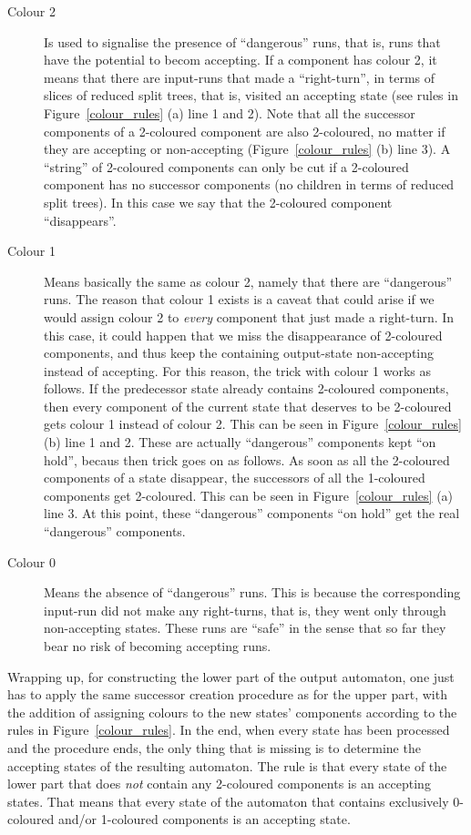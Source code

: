 \begin{description}
\item[Colour 2]
Is used to signalise the presence of ``dangerous'' runs, that is, runs that have the potential to becom accepting. If a component has colour 2, it means that there are input-runs that made a ``right-turn'', in terms of slices of reduced split trees, that is, visited an accepting state (see rules in Figure~\ref{colour_rules} (a) line 1 and 2). Note that all the successor components of a 2-coloured component are also 2-coloured, no matter if they are accepting or non-accepting (Figure~\ref{colour_rules} (b) line 3). A ``string'' of 2-coloured components can only be cut if a 2-coloured component has no successor components (no children in terms of reduced split trees). In this case we say that the 2-coloured component ``disappears''.

\item[Colour 1]
Means basically the same as colour 2, namely that there are ``dangerous'' runs. The reason that colour 1 exists is a caveat that could arise if we would assign colour 2 to \textit{every} component that just made a right-turn. In this case, it could happen that we miss the disappearance of 2-coloured components, and thus keep the containing output-state non-accepting instead of accepting. For this reason, the trick with colour 1 works as follows. If the predecessor state already contains 2-coloured components, then every component of the current state that deserves to be 2-coloured gets colour 1 instead of colour 2. This can be seen in Figure~\ref{colour_rules} (b) line 1 and 2. These are actually ``dangerous'' components kept ``on hold'', becaus then trick goes on as follows. As soon as all the 2-coloured components of a state disappear, the successors of all the 1-coloured components get 2-coloured. This can be seen in Figure~\ref{colour_rules} (a) line 3. At this point, these ``dangerous'' components ``on hold'' get the real ``dangerous'' components.

\item[Colour 0]
Means the absence of ``dangerous'' runs. This is because the corresponding input-run did not make any right-turns, that is, they went only through non-accepting states. These runs are ``safe'' in the sense that so far they bear no risk of becoming accepting runs.
\end{description}

Wrapping up, for constructing the lower part of the output automaton, one just has to apply the same successor creation procedure as for the upper part, with the addition of assigning colours to the new states' components according to the rules in Figure~\ref{colour_rules}. In the end, when every state has been processed and the procedure ends, the only thing that is missing is to determine the accepting states of the resulting automaton. The rule is that every state of the lower part that does \textit{not} contain any 2-coloured components is an accepting states. That means that every state of the automaton that contains exclusively 0-coloured and/or 1-coloured components is an accepting state.

